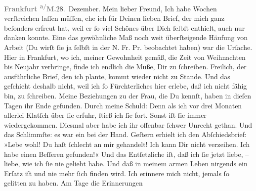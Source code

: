 \begin{ledgroupsized}[t]{13cm}
           \pstart
           \raggedleft{}\textcolor{gray}{\textbf{Frankfurt \textsuperscript{a/}M.}}28. Dezember.\pend
           \pstart{}Mein lieber Freund,\pend\pstart
           Ich habe Wochen verſtreichen laſſen müſſen, ehe ich für Deinen lieben Brief, der mich
               ganz beſonders erfreut hat, weil er ſo viel Schönes über Dich ſelbſt enthielt, auch
               nur danken konnte. Eine das gewöhnliche Maß noch weit überſteigende Häufung von
               Arbeit (Du wirſt ſie ja ſelbſt in der N. Fr. Pr.
               beobachtet haben) war die Urſache. Hier in Frankfurt, wo ich, meiner Gewohnheit gemäß, die Zeit von Weihnachten bis Neujahr
               verbringe, finde ich endlich die {\pb}Muße, Dir zu
               ſchreiben. Freilich, der ausführliche Brief, den ich plante, kommt wieder nicht zu
               Stande. Und das geſchieht deshalb nicht, weil ich ſo Fürchterliches hier erlebe, daß
               ich nicht fähig bin, zu ſchreiben. Meine Beziehungen zu der 
               Frau, die Du
                  kennſt, haben in dieſen Tagen ihr Ende gefunden. Durch meine Schuld: Denn als ich
               vor drei Monaten allerlei Klatſch über ſie erfuhr, ſtieß ich ſie fort. Sonst iſt ſie
               immer wiedergekommen. Diesmal aber habe ich ihr offenbar ſchwer Unrecht gethan. Und das
               Schlimmſte: es war ein \label{K_L03231-3v}\label{K_L03231-3h} bei der Hand.
                  Geſtern erhielt ich den Abſchiedsbrief: »Lebe wohl!
               Du haſt ſchlecht an mir gehandelt! Ich kann Dir nicht verzeihen. Ich habe einen Beſſeren gefunden!«\pend
           \pstart
           Und das Entſetzliche iſt, daß ich ſie jetzt liebe, – liebe, wie ich ſie nie geliebt
               habe. Und daß in meinem armen Leben nirgends ein Erſatz iſt und nie mehr ſich finden
               wird. Ich erinnere mich nicht, jemals ſo gelitten zu haben. Am Tage die Erinnerungen

\end{ledgroupsized}
